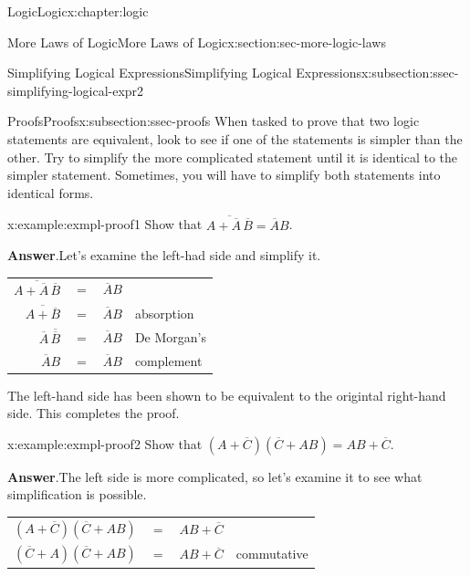 \documentclass[twoside,10pt,]{book}
\newcommand{\blocktitlefont}{\relax}
\newcommand{\tabularfont}{\relax}
\numberwithin{equation}{section}
\begin{document}
\begin{chapterptx}{Logic}{}{Logic}{}{}{x:chapter:logic}
\begin{sectionptx}{More Laws of Logic}{}{More Laws of Logic}{}{}{x:section:sec-more-logic-laws}
\begin{subsectionptx}{Simplifying Logical Expressions}{}{Simplifying Logical Expressions}{}{}{x:subsection:ssec-simplifying-logical-expr2}
\end{subsectionptx}
%
%
\typeout{************************************************}
\typeout{************************************************}
%
\begin{subsectionptx}{Proofs}{}{Proofs}{}{}{x:subsection:ssec-proofs}
%
%
%
When tasked to prove that two logic statements are equivalent, look to see if one of the statements is simpler than the other.  Try to simplify the more complicated statement until it is identical to the simpler statement.  Sometimes, you will have to simplify both statements into identical forms.%
\begin{example}{}{x:example:exmpl-proof1}%
Show that \(\overline{A+\overline{A}\,\overline{B}}=\overline{A}B\).\par\smallskip%
\noindent\textbf{\blocktitlefont Answer}.\label{g:answer:idp28546008}{}\hypertarget{g:answer:idp28546008}{}\quad{}Let's examine the left-had side and simplify it. \begin{center}%
{\tabularfont%
\begin{tabular}{llll}
\multicolumn{1}{r}{\(\overline{A+\overline{A}\,\overline{B}}\)}&\(=\)&\(\overline{A}B\)&\tabularnewline[0pt]
\multicolumn{1}{r}{\(\overline{A+\overline{B}}\)}&\(=\)&\(\overline{A}B\)&absorption\tabularnewline[0pt]
\multicolumn{1}{r}{\(\overline{A}\,\overline{\overline{B}}\)}&\(=\)&\(\overline{A}B\)&De Morgan's\tabularnewline[0pt]
\multicolumn{1}{r}{\(\overline{A}B\)}&\(=\)&\(\overline{A}B\)&complement
\end{tabular}
}%
\end{center}%
The left-hand side has been shown to be equivalent to the origintal right-hand side.  This completes the proof.%
\end{example}
\begin{example}{}{x:example:exmpl-proof2}%
Show that \((A+\overline{C})(\overline{C}+AB)=AB+\overline{C}\).\par\smallskip%
\noindent\textbf{\blocktitlefont Answer}.\label{g:answer:idp28550744}{}\hypertarget{g:answer:idp28550744}{}\quad{}The left side is more complicated, so let's examine it to see what simplification is possible. \begin{center}%
{\tabularfont%
\begin{tabular}{llll}
\multicolumn{1}{r}{\((A+\overline{C})(\overline{C}+AB)\)}&\(=\)&\(AB+\overline{C}\)&\tabularnewline[0pt]
\multicolumn{1}{r}{\((\overline{C}+A)(\overline{C}+AB)\)}&\(=\)&\(AB+\overline{C}\)&commutative\tabularnewline[0pt]

\end{tabular}}
\end{center}
\end{example}
\end{subsectionptx}
\end{sectionptx}
\end{chapterptx}
\end{document}
